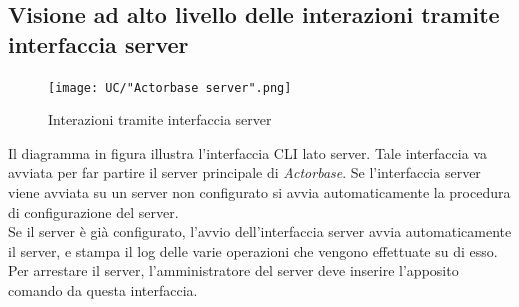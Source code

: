 \documentclass[a4paper]{article}
\begin{document}
		 \subsection{Visione ad alto livello delle interazioni tramite interfaccia server}
		 	\begin{figure}[H]
				\centering
				\texttt{[image: UC/"Actorbase server".png]}
				\caption{Interazioni tramite interfaccia server}
			\end{figure}
			Il diagramma in figura illustra l'interfaccia CLI lato server. Tale interfaccia va avviata per far partire il server principale di \emph{Actorbase}. Se l'interfaccia server viene avviata su un server non configurato si avvia automaticamente la procedura di configurazione del server. 
			\\ 
			Se il server è già configurato, l'avvio dell'interfaccia server avvia automaticamente il server, e stampa il log delle varie operazioni che vengono effettuate su di esso.
			\\ 
			Per arrestare il server, l'amministratore del server deve inserire l'apposito comando da questa interfaccia.
			
\end{document}
